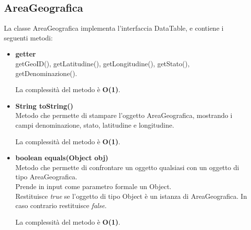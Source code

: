 \documentclass[a4paper, 12pt]{scrreprt}
\begin{document}
			\subsection{AreaGeografica}
			La classe AreaGeografica implementa l'interfaccia DataTable, e contiene i seguenti metodi:
				\begin{itemize}
				\item \textbf{getter}
				\\getGeoID(), getLatitudine(), getLongitudine(), getStato(), getDenominazione().
				
				La complessit\`a del metodo è \textbf{O(1)}.
				
				\item \textbf{String toString()}
				\\Metodo che permette di stampare l'oggetto AreaGeografica, mostrando i campi denominazione, stato, latitudine e longitudine.
				
				La complessit\`a del metodo è \textbf{O(1)}.
				
				\item \textbf{boolean equals(Object obj)}
				\\Metodo che permette di confrontare un oggetto qualsiasi con un oggetto di tipo AreaGeografica.
				\\Prende in input come parametro formale un Object.
				\\Restituisce \textit{true} se l'oggetto di tipo Object \`e un istanza di AreaGeografica. In caso contrario restituisce \textit{false}.
				
				La complessit\`a del metodo è \textbf{O(1)}.
				
			\end{itemize}
\end{document}
